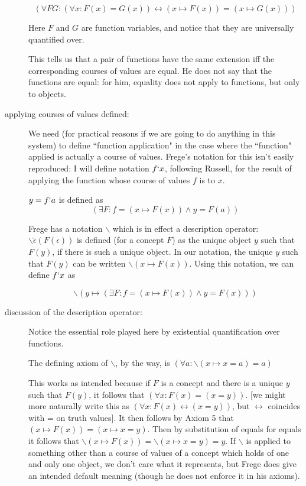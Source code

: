 \documentclass[12pt]{article}
\begin{document}
\begin{description}
$$(\forall FG:(\forall x:F(x) = G(x)) \leftrightarrow (x \mapsto F(x)) = (x \mapsto G(x)))$$

Here $F$ and $G$ are function variables, and notice that they are universally quantified over.

This tells us that a pair of functions have the same extension iff the corresponding courses of values are equal.  He does not say that the functions are equal:  for him, equality does not apply to functions, but only to objects.

\item[applying courses of values defined:]  We need (for practical reasons if we are going to do anything in this system) to define ``function application" in the case where the ``function" applied is actually a course of values.
Frege's notation for this isn't easily reproduced:  I will define notation $f`x$, following Russell, for the result of applying the function whose course of values $f$ is to $x$.

$y = f`a$ is defined as $$(\exists F:f = (x \mapsto F(x)) \wedge y = F(a))$$

Frege has a notation $\backslash$ which is in effect a description operator: $\backslash \grave{\epsilon}(F(\epsilon))$ is defined (for a concept $F$) as the unique object $y$ such that $F(y)$, if there is such a unique object.
In our notation, the unique $y$ such that $F(y)$ can be written $\backslash(x \mapsto F(x))$.
Using this notation, we can define $f`x$ as

$$\backslash(y \mapsto (\exists F:f = (x \mapsto F(x)) \wedge y = F(x)))$$

\item[discussion of the description operator:]  Notice the essential role played here by existential quantification over functions.

The defining axiom of $\backslash$, by the way, is $(\forall a:\backslash(x \mapsto x=a) = a)$

This works as intended because if $F$ is a concept and there is a unique $y$ such that $F(y)$, it follows that $(\forall x:F(x) = (x=y))$.  [we might more naturally write this as $(\forall x:F(x) \leftrightarrow  (x=y))$, but $\leftrightarrow$ coincides with = on truth values].   It then follows by Axiom 5 that
$(x \mapsto F(x)) = (x \mapsto x=y)$.  Then by substitution of equals for equals it follows that $\backslash(x \mapsto F(x)) = \backslash(x \mapsto x=y) = y$.  If $\backslash$ is applied to something other than a course of values of a concept which holds of one and only one object, we don't care what it represents, but Frege does give an intended default meaning (though he does not enforce it in his axioms).


\end{description}
\end{document}
